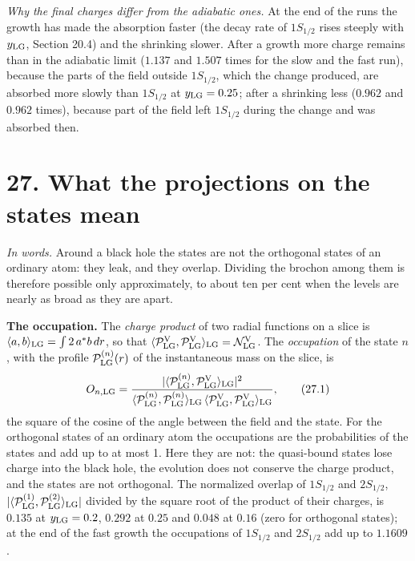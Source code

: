 \documentclass[
  10pt,
]{article}
\begin{document}
\emph{Why the final charges differ from the adiabatic ones.} At the end
of the runs the growth has made the absorption faster (the decay rate of
\(1S_{1/2}\) rises steeply with \(y_{\rm LG}\), Section 20.4) and the
shrinking slower. After a growth more charge remains than in the
adiabatic limit (\(1.137\) and \(1.507\) times for the slow and the fast
run), because the parts of the field outside \(1S_{1/2}\), which the
change produced, are absorbed more slowly than \(1S_{1/2}\) at
\(y_{\rm LG}=0.25\); after a shrinking less (\(0.962\) and \(0.962\)
times), because part of the field left \(1S_{1/2}\) during the change
and was absorbed then.

\hypertarget{what-the-projections-on-the-states-mean}{%
\section{27. What the projections on the states
mean}\label{what-the-projections-on-the-states-mean}}

\emph{In words.} Around a black hole the states are not the orthogonal
states of an ordinary atom: they leak, and they overlap. Dividing the
brochon among them is therefore possible only approximately, to about
ten per cent when the levels are nearly as broad as they are apart.

\textbf{The occupation.} The \emph{charge product} of two radial
functions on a slice is \(\langle a,b\rangle_{\rm LG}=\int2\,a^*b\,dr\),
so that
\(\langle\mathcal P^{\rm V}_{\rm LG},\mathcal P^{\rm V}_{\rm LG}\rangle_{\rm LG}=\mathcal N^{\rm V}_{\rm LG}\).
The \emph{occupation} of the state \(n\), with the profile
\(\mathcal P^{(n)}_{\rm LG}(r)\) of the instantaneous mass on the slice,
is
\[O_{n,{\rm LG}}=\frac{\lvert\langle\mathcal P^{(n)}_{\rm LG},\mathcal P^{\rm V}_{\rm LG}\rangle_{\rm LG}\rvert^2}{\langle\mathcal P^{(n)}_{\rm LG},\mathcal P^{(n)}_{\rm LG}\rangle_{\rm LG}\,\langle\mathcal P^{\rm V}_{\rm LG},\mathcal P^{\rm V}_{\rm LG}\rangle_{\rm LG}},\tag{27.1}\]
the square of the cosine of the angle between the field and the state.
For the orthogonal states of an ordinary atom the occupations are the
probabilities of the states and add up to at most 1. Here they are not:
the quasi-bound states lose charge into the black hole, the evolution
does not conserve the charge product, and the states are not orthogonal.
The normalized overlap of \(1S_{1/2}\) and \(2S_{1/2}\),
\(\lvert\langle\mathcal P^{(1)}_{\rm LG},\mathcal P^{(2)}_{\rm LG}\rangle_{\rm LG}\rvert\)
divided by the square root of the product of their charges, is \(0.135\)
at \(y_{\rm LG}=0.2\), \(0.292\) at \(0.25\) and \(0.048\) at \(0.16\)
(zero for orthogonal states); at the end of the fast growth the
occupations of \(1S_{1/2}\) and \(2S_{1/2}\) add up to \(1.1609\).
\end{document}
